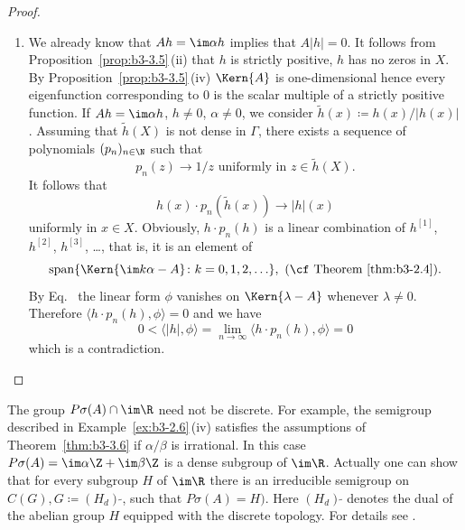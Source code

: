 \begin{proof}
\begin{enumerate}[wide, labelindent=.25em]
	\item[(iii)] 
	We already know that $Ah = \im\alpha h$ implies that $A|h| = 0$.
	It follows from Proposition~\ref{prop:b3-3.5}\,(ii) that $h$ is strictly positive, \ie $h$ has no zeros in $X$.
	By Proposition~\ref{prop:b3-3.5}\,(iv) $\Kern{A}$ is one-dimensional hence every
	eigenfunction corresponding to $0$ is the scalar multiple of a strictly positive function.
	If\/ $Ah = \im\alpha h$, $h \neq 0$, $\alpha \neq 0$, we consider $\tilde{h}(x) \coloneq h(x)/|h(x)|$.
	Assuming that $\tilde{h}(X)$ is not dense in $\Gamma$, there exists a sequence of polynomials $(p_{n})_{n\in\N}$ such that
	\begin{equation}\label{eq:b3-3.8}
		p_{n}(z) \to 1/z \text{ uniformly in } z \in \tilde{h}(X).
	\end{equation}
	It follows that 
    \[%
    h(x)\cdot p_{n}(\tilde{h}(x)) \to |h|(x)
    \]
    uniformly in $x \in X$.
	Obviously, $h\cdot p_{n}(h)$ is a linear combination of\/ $h^{[1]}$, $h^{[2]}$, $h^{[3]}$, \ldots, that is, it is an element of
	\[
	\text{span$\{\Kern{ \im k\alpha - A} \colon  k=0,1,2,\ldots \}$}, \  \text{(\cf Theorem~\ref{thm:b3-2.4})}.
	\]
	By Eq.~ the linear form $\phi$ vanishes on $\Kern{\lambda - A}$ whenever $\lambda \neq 0$.
	Therefore $\langle h\cdot p_{n}(h),\phi\rangle = 0$ and we have 
    \[
    0 < \langle|h|,\phi\rangle = \lim_{n\to\infty}\langle h\cdot p_{n}(h),\phi\rangle = 0
    \]
    which is a contradiction.
    \qedhere
	\end{enumerate}
\end{proof}
The group $P\sigma(A) \cap \im\R$ need not be discrete. 
For example, the semigroup described in Example~\ref{ex:b3-2.6}\,(iv) satisfies the assumptions of Theorem~\ref{thm:b3-3.6} if\/ ${\alpha}/{\beta}$ is irrational. 
In this case $P\sigma(A) = \im\alpha \Z + \im\beta \Z$ is a dense subgroup of\/ $\im \R$. 
Actually one can show that for every subgroup $H$ of\/ $\im \R$ there is an irreducible semigroup on $C(G), G \coloneqq (H_d)\,{\tilde{ }}$, such that $P\sigma(A) = H)$. 
Here $(H_d)\,{\tilde{ }}$ denotes the dual of the abelian group $H$ equipped with the discrete topology. 
For details see \textcite[p.62]{greiner:1982}. 

